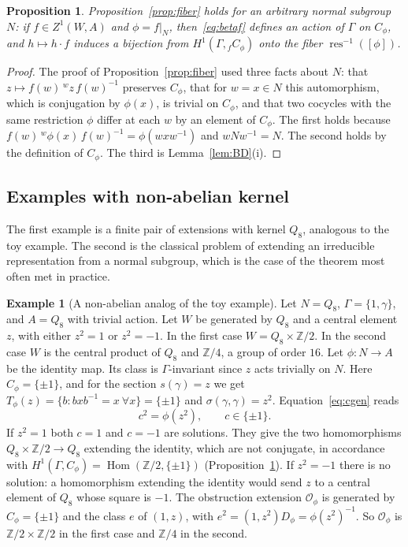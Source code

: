 \documentclass[12pt,letterpaper]{article}
\numberwithin{equation}{section}
\theoremstyle{plain}
\newtheorem{proposition}[theorem]{Proposition}
\theoremstyle{definition}
\newtheorem{example}[theorem]{Example}
\newcommand{\Z}{\mathbb{Z}}
\newcommand{\act}[2]{{}^{#1}\!#2}          %
\DeclareMathOperator{\Hom}{Hom}
\DeclareMathOperator{\res}{res}
\begin{document}
\begin{proposition}\label{prop:fiber-general}
Proposition~\ref{prop:fiber} holds for an arbitrary normal subgroup $N$:
if $f\in Z^1(W,A)$ and $\phi=f|_N$, then~\eqref{eq:betaf} defines an
action of $\Gamma$ on $C_\phi$, and $h\mapsto h\cdot f$ induces a
bijection from $H^1(\Gamma,{}_fC_\phi)$ onto the fiber
$\res^{-1}([\phi])$.
\end{proposition}

\begin{proof}
The proof of Proposition~\ref{prop:fiber} used three facts about $N$:
that $z\mapsto f(w)\,\act{w}{z}\,f(w)^{-1}$ preserves $C_\phi$, that for
$w=x\in N$ this automorphism, which is conjugation by $\phi(x)$, is
trivial on $C_\phi$, and that two cocycles with the same restriction
$\phi$ differ at each $w$ by an element of $C_\phi$. The first holds
because $f(w)\,\act{w}{\phi(x)}\,f(w)^{-1}=\phi(wxw^{-1})$ and
$wNw^{-1}=N$. The second holds by the definition of $C_\phi$. The third is
Lemma~\ref{lem:BD}(i).
\end{proof}

\subsection{Examples with non-abelian kernel}

The first example is a finite pair of extensions with kernel $Q_8$,
analogous to the toy example. The second is the classical problem of
extending an irreducible representation from a normal subgroup, which is
the case of the theorem most often met in practice.

\begin{example}[A non-abelian analog of the toy example]\label{ex:pauli}
Let $N=Q_8$, $\Gamma=\{1,\gamma\}$, and $A=Q_8$ with trivial action. Let
$W$ be generated by $Q_8$ and a central element $z$, with either $z^2=1$
or $z^2=-1$. In the first case $W=Q_8\times\Z/2$. In the second case $W$
is the central product of $Q_8$ and $\Z/4$, a group of order $16$. Let
$\phi:N\to A$ be the identity map. Its class is $\Gamma$-invariant since
$z$ acts trivially on $N$. Here $C_\phi=\{\pm1\}$, and for the section
$s(\gamma)=z$ we get $T_\phi(z)=\{b:bxb^{-1}=x\ \forall x\}=\{\pm1\}$ and
$\sigma(\gamma,\gamma)=z^2$. Equation~\eqref{eq:cgen} reads
\[
c^2=\phi(z^2),\qquad c\in\{\pm1\}.
\]
If $z^2=1$ both $c=1$ and $c=-1$ are solutions. They give the two
homomorphisms $Q_8\times\Z/2\to Q_8$ extending the identity, which are not
conjugate, in accordance with
$H^1(\Gamma,C_\phi)=\Hom(\Z/2,\{\pm1\})$
(Proposition~\ref{prop:fiber-general}). If $z^2=-1$ there is no solution:
a homomorphism extending the identity would send $z$ to a central element
of $Q_8$ whose square is $-1$. The obstruction extension
$\mathcal{O}_\phi$ is generated by $C_\phi=\{\pm1\}$ and the class $e$ of
$(1,z)$, with $e^2=(1,z^2)D_\phi=\phi(z^2)^{-1}$. So $\mathcal{O}_\phi$ is
$\Z/2\times\Z/2$ in the first case and $\Z/4$ in the second.
\end{example}
\end{document}
